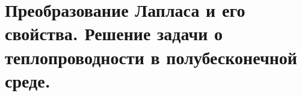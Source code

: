 \section{Преобразование Лапласа и его свойства. Решение задачи о
теплопроводности в полубесконечной среде.}

\newpage
